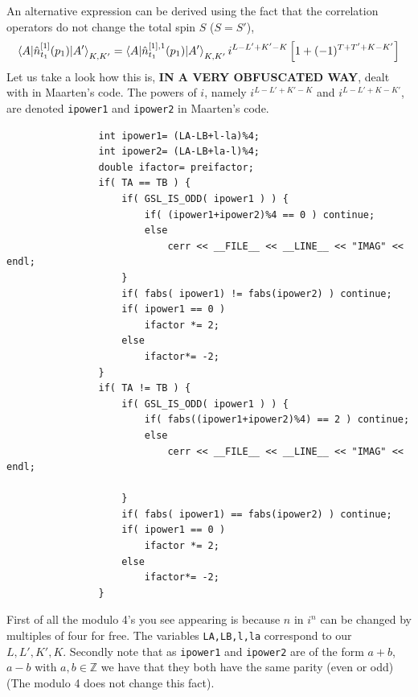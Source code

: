 \documentclass[10pt]{article}
\begin{document}
An alternative expression can be derived using the fact that the correlation 
operators do not change the total spin $S$ ($S=S'$),
\begin{align*}
	\braket{ A | \hat{n}_{t_1}^{[1]}(p_1) | A'}_{K,K'} = \braket{ A | 
\hat{n}_{t_1}^{[1],1}(p_1) | A'}_{K,K'} i^{L-L'+K'-K} \left[ 1 + 
(-1)^{T+T'+K-K'} \right]
\end{align*}
Let us take a look how this is, \textbf{IN A VERY OBFUSCATED WAY}, dealt with 
in Maarten's code.
The powers of $i$, namely $i^{L-L'+K'-K}$ and $i^{L-L'+K-K'}$, are denoted 
\texttt{ipower1} and \texttt{ipower2} in Maarten's code.
\begin{verbatim}
                int ipower1= (LA-LB+l-la)%4;
                int ipower2= (LA-LB+la-l)%4;
                double ifactor= preifactor;
                if( TA == TB ) {
                    if( GSL_IS_ODD( ipower1 ) ) {
                        if( (ipower1+ipower2)%4 == 0 ) continue;
                        else
                            cerr << __FILE__ << __LINE__ << "IMAG" << endl;
                    }
                    if( fabs( ipower1) != fabs(ipower2) ) continue;
                    if( ipower1 == 0 )
                        ifactor *= 2;
                    else
                        ifactor*= -2;
                }
                if( TA != TB ) {
                    if( GSL_IS_ODD( ipower1 ) ) {
                        if( fabs((ipower1+ipower2)%4) == 2 ) continue;
                        else
                            cerr << __FILE__ << __LINE__ << "IMAG" << endl;

                    }
                    if( fabs( ipower1) == fabs(ipower2) ) continue;
                    if( ipower1 == 0 )
                        ifactor *= 2;
                    else
                        ifactor*= -2;
                }
\end{verbatim}
First of all the modulo 4's you see appearing is because $n$ in $i^n$ can be 
changed by multiples of four for free. The variables \texttt{LA,LB,l,la} 
correspond to our $L,L',K',K$. Secondly note that as \texttt{ipower1} and 
\texttt{ipower2} are of the form $a+b$,$a-b$ with $a,b \in \mathds{Z}$ we have 
that they both have the same parity (even or odd) (The modulo 4 does not change 
this fact).
\end{document}
